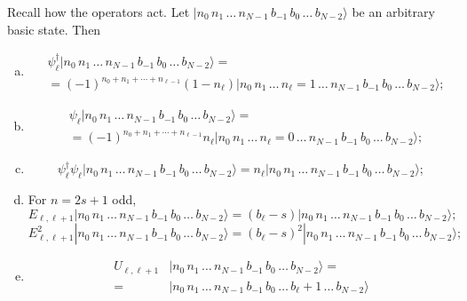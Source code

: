 	Recall how the operators act. Let $|n_0 \, n_1\, \ldots \, n_{N-1}\, b_{-1}\, b_0 \, \ldots \, b_{N-2}\rangle$ be an arbitrary basic state. Then
	\begin{enumerate}[(a)]
	\item \[\begin{split}
	&\psi^\dagger_\ell |n_0 \, n_1\, \ldots \, n_{N-1}\, b_{-1}\, b_0 \, \ldots \, b_{N-2}\rangle =  \\
&=(-1)^{n_0 + n_1 + \cdots + n_{\ell-1}}(1-n_\ell)|n_0 \, n_1\, \ldots\, n_\ell=1\, \ldots \, n_{N-1}\, b_{-1}\, b_0 \, \ldots \, b_{N-2}\rangle;
	\end{split}
	\]
	\item %
	\[\begin{split}
	&\psi_\ell |n_0 \, n_1\, \ldots \, n_{N-1}\, b_{-1}\, b_0 \, \ldots \, b_{N-2}\rangle =  \\
&=(-1)^{n_0 + n_1 + \cdots + n_{\ell-1}}n_\ell|n_0 \, n_1\, \ldots\, n_\ell=0\, \ldots \, n_{N-1}\, b_{-1}\, b_0 \, \ldots \, b_{N-2}\rangle;
	\end{split}
	\]
	\item %
	\[
	\psi^\dagger_{\ell} \psi_{\ell} |n_0 \, n_1\, \ldots \, n_{N-1}\, b_{-1}\, b_0 \, \ldots \, b_{N-2}\rangle = n_\ell |n_0 \, n_1\, \ldots \, n_{N-1}\, b_{-1}\, b_0 \, \ldots \, b_{N-2}\rangle;
	\]
	\item For $n = 2s+1$ odd, %
	\[
	E_{\ell,\ell+1} |n_0 \, n_1\, \ldots \, n_{N-1}\, b_{-1}\, b_0 \, \ldots \, b_{N-2}\rangle = (b_{\ell}-s) |n_0 \, n_1\, \ldots \, n_{N-1}\, b_{-1}\, b_0 \, \ldots \, b_{N-2}\rangle;
	\]
	\[
	E_{\ell,\ell+1}^2 |n_0 \, n_1\, \ldots \, n_{N-1}\, b_{-1}\, b_0 \, \ldots \, b_{N-2}\rangle = (b_\ell -s)^2 |n_0 \, n_1\, \ldots \, n_{N-1}\, b_{-1}\, b_0 \, \ldots \, b_{N-2}\rangle;
	\]
	\item \[\begin{split}
	U_{\ell,\ell+1} &|n_0 \, n_1\, \ldots \, n_{N-1}\, b_{-1}\, b_0 \, \ldots \, b_{N-2}\rangle =\\= &|n_0 \, n_1\, \ldots \, n_{N-1}\, b_{-1}\, b_0 \, \ldots \, b_{\ell}+1\, \ldots\, b_{N-2}\rangle
	\end{split}
	\]%

\end{enumerate}
